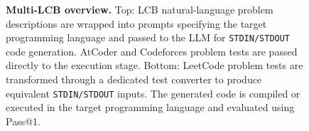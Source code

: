 \begin{figure}[t]
\caption{\textbf{Multi-LCB overview.}  
Top: LCB natural-language problem descriptions are wrapped into prompts specifying the target programming language and passed to the LLM for \texttt{STDIN/STDOUT} code generation.  
AtCoder and Codeforces problem tests are passed directly to the execution stage. 
Bottom: LeetCode problem tests are transformed through a dedicated test converter to produce equivalent \texttt{STDIN/STDOUT} inputs. 
The generated code is compiled or executed in the target programming language and evaluated using Pass@1.}
\label{fig:multi-lcb-overview}
\end{figure}
